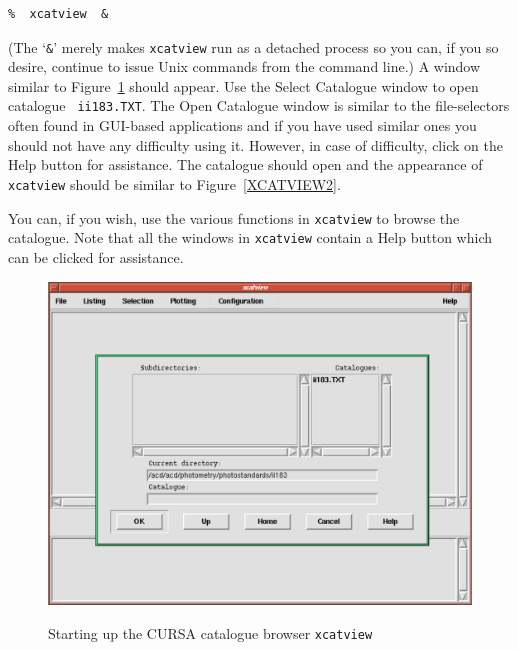 \documentclass[twoside,11pt]{article}
\begin{document}
\begin{enumerate}
\begin{verbatim}
%  xcatview  &
\end{verbatim}

   (The `{\tt \&}' merely makes {\tt xcatview} run as a detached process
   so you can, if you so desire, continue to issue Unix commands from the
   command line.)  A window similar to Figure~\ref{XCATVIEW1} should
   appear.  Use the {\sf Select Catalogue} window to open catalogue {\tt
   ii183.TXT}.  The {\sf Open Catalogue} window is similar to the
   file-selectors often found in GUI-based applications and if you have
   used similar ones you should not have any difficulty using it.
   However, in case of difficulty, click on the {\sf Help} button for
   assistance.  The catalogue should open and the appearance of {\tt
   xcatview} should be similar to Figure~\ref{XCATVIEW2}.

   You can, if you wish, use the various functions in {\tt xcatview}
   to browse the catalogue.  Note that all the windows in {\tt xcatview}
   contain a {\sf Help} button which can be clicked for assistance.

  \begin{figure}[htbp]
     \centering
     \includegraphics[totalheight=3.25in]{sc6_xcatview1}
     \begin{quote}
     \caption{Starting up the CURSA catalogue browser {\tt xcatview}
     \label{XCATVIEW1} }
     \end{quote}
  \end{figure}


\end{enumerate}
\end{document}
